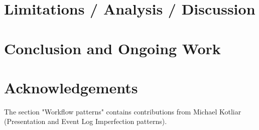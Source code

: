 \section{Limitations / Analysis / Discussion}

\section{Conclusion and Ongoing Work}

\section{Acknowledgements}

The section "Workflow patterns" contains contributions from Michael Kotliar
(Presentation and Event Log Imperfection patterns).



